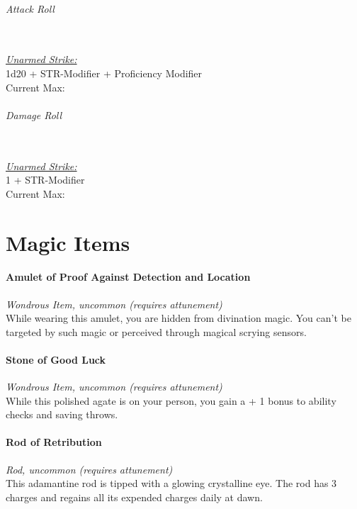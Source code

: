 \documentclass[letterpaper,openany,oneside,twocolumn]{book}
\begin{document}
\paragraph*{Attack Roll}\hfill\\
\underline{\textit{Unarmed Strike:}}\\
1d20 + STR-Modifier + Proficiency Modifier\\
\indent Current Max: 
\paragraph*{Damage Roll}\hfill\\
\underline{\textit{Unarmed Strike:}}\\
1 + STR-Modifier\\
\indent Current Max: 

\part*{Magic Items}

\subsection*{Amulet of Proof Against Detection and Location}
\textit{Wondrous Item, uncommon (requires attunement)}\\
While wearing this amulet, you are hidden from divination magic. You can't be targeted by such magic or perceived through magical scrying sensors.

\subsection*{Stone of Good Luck}
\textit{Wondrous Item, uncommon (requires attunement)}\\
While this polished agate is on your person, you gain a + 1 bonus to ability checks and saving throws.

\subsection*{Rod of Retribution}
\textit{Rod, uncommon (requires attunement)}\\
This adamantine rod is tipped with a glowing crystalline eye. The rod has 3 charges and regains all its expended charges daily at dawn.
\end{document}
